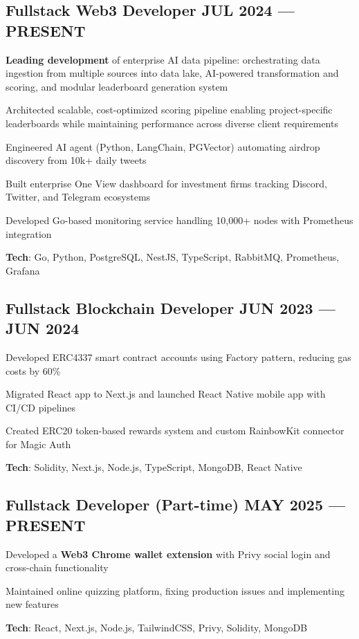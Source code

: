 \subsection{{Fullstack Web3 Developer \hfill JUL 2024 --- PRESENT}}\begin{zitemize}\item \textbf{Leading development} of enterprise AI data pipeline: orchestrating data ingestion from multiple sources into data lake, AI-powered transformation and scoring, and modular leaderboard generation system\item Architected scalable, cost-optimized scoring pipeline enabling project-specific leaderboards while maintaining performance across diverse client requirements\item Engineered AI agent (Python, LangChain, PGVector) automating airdrop discovery from 10k+ daily tweets\item Built enterprise One View dashboard for investment firms tracking Discord, Twitter, and Telegram ecosystems\item Developed Go-based monitoring service handling 10,000+ nodes with Prometheus integration\item \textbf{Tech}: Go, Python, PostgreSQL, NestJS, TypeScript, RabbitMQ, Prometheus, Grafana\end{zitemize}\subsection{{Fullstack Blockchain Developer \hfill JUN 2023 --- JUN 2024}}\begin{zitemize}\item Developed ERC4337 smart contract accounts using Factory pattern, reducing gas costs by 60\%\item Migrated React app to Next.js and launched React Native mobile app with CI/CD pipelines\item Created ERC20 token-based rewards system and custom RainbowKit connector for Magic Auth\item \textbf{Tech}: Solidity, Next.js, Node.js, TypeScript, MongoDB, React Native\end{zitemize}\subsection{{Fullstack Developer (Part-time) \hfill MAY 2025 --- PRESENT}}\begin{zitemize}\item Developed a \textbf{Web3 Chrome wallet extension} with Privy social login and cross-chain functionality\item Maintained online quizzing platform, fixing production issues and implementing new features\item \textbf{Tech}: React, Next.js, Node.js, TailwindCSS, Privy, Solidity, MongoDB\end{zitemize}